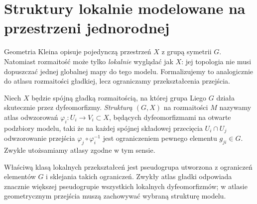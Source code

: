 \section{Struktury lokalnie modelowane na przestrzeni jednorodnej}
\label{sec:thur-dop-struktury-gx}
Geometria Kleina opisuje pojedynczą przestrzeń $X$ z grupą
symetrii $G$. Natomiast rozmaitość może tylko \emph{lokalnie}
wyglądać jak $X$: jej topologia nie musi dopuszczać
jednej globalnej mapy do tego modelu. Formalizujemy to
analogicznie do atlasu rozmaitości gładkiej, lecz ograniczamy
przekształcenia przejścia.

\begin{definicja}
\label{def:thur-dop-gx-atlas}
Niech $X$ będzie spójną gładką rozmaitością, na której grupa Liego
$G$ działa skutecznie przez dyfeomorfizmy. \emph{Strukturą $(G,X)$}
na rozmaitości $M$ nazywamy atlas odwzorowań
$\varphi_i:U_i\to V_i\subset X$, będących dyfeomorfizmami
na otwarte podzbiory modelu, taki że na każdej spójnej składowej
przecięcia $U_i\cap U_j$ odwzorowanie przejścia
$\varphi_j\circ\varphi_i^{-1}$ jest ograniczeniem
pewnego elementu $g_{ji}\in G$. Zwykle utożsamiamy atlasy
zgodne w tym sensie.
\end{definicja}

Właściwą klasą lokalnych przekształceń jest pseudogrupa
utworzona z ograniczeń elementów $G$ i sklejania takich
ograniczeń. Zwykły atlas gładki odpowiada znacznie większej
pseudogrupie wszystkich lokalnych dyfeomorfizmów;
w atlasie geometrycznym przejścia muszą zachowywać
wybraną strukturę modelu.

